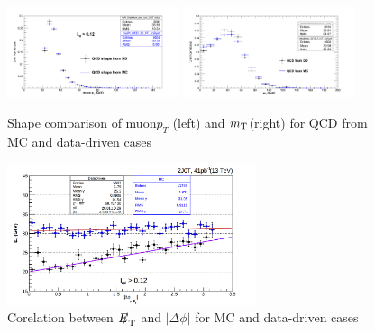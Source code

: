 \begin{figure}[hbpt]                                                                                                                                                                            
\begin{center}
\includegraphics[width=0.45\textwidth]{figures/2J0T/QCD_Shape_Comparison_muPt.png}
\includegraphics[width=0.45\textwidth]{figures/2J0T/QCD_Shape_Comparison_MtW.png}\hfill
\caption{\label{fig:muPt_mT}Shape comparison of muon$p_{T}$ (left) and $m_{\mathrm{\rm T}}$(right) for QCD from MC and data-driven cases}
\end{center}
\end{figure}

\begin{figure}[hbpt]                                                                                                                                                                            
\begin{center}
\includegraphics[width=0.65\textwidth]{figures/2J0T/MET_vs_dphimuMET.png}
\caption{\label{fig:dphi_MET} Corelation between ${E\!\!\!/}_{\mathrm{T}}$ and $|\Delta\phi|$ for MC and data-driven cases}
\end{center}
\end{figure} 
